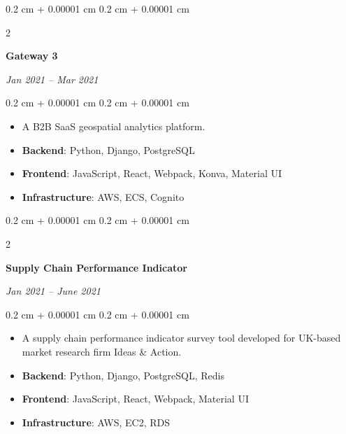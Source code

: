 \documentclass[10pt, a4paper]{article}
\newenvironment{highlights}{
    \begin{itemize}[
        topsep=0.10 cm,
        parsep=0.10 cm,
        partopsep=0pt,
        itemsep=0pt,
        leftmargin=0.4 cm + 10pt
    ]
}{
    \end{itemize}
} %
\newenvironment{onecolentry}{
    \begin{adjustwidth}{
        0.2 cm + 0.00001 cm
    }{
        0.2 cm + 0.00001 cm
    }
}{
    \end{adjustwidth}
} %
\newenvironment{twocolentry}[2][]{
    \onecolentry
    \def\secondColumn{#2}
    \setcolumnwidth{\fill, 4.5 cm}
    \begin{paracol}{2}
}{
    \switchcolumn \raggedleft \secondColumn
    \end{paracol}
    \endonecolentry
} %
\begin{document}
        \vspace{0.2 cm}

        \begin{twocolentry}{
            
            
        \textit{Jan 2021 – Mar 2021}}
            \textbf{Gateway 3}
        \end{twocolentry}

        \vspace{0.10 cm}
        \begin{onecolentry}
            \begin{highlights}
                \item A B2B SaaS geospatial analytics platform.
                \item \textbf{Backend}: Python, Django, PostgreSQL
                \item \textbf{Frontend}: JavaScript, React, Webpack, Konva, Material UI
                \item \textbf{Infrastructure}: AWS, ECS, Cognito
            \end{highlights}
        \end{onecolentry}


        \vspace{0.2 cm}

        \begin{twocolentry}{
            
            
        \textit{Jan 2021 – June 2021}}
            \textbf{Supply Chain Performance Indicator}
        \end{twocolentry}

        \vspace{0.10 cm}
        \begin{onecolentry}
            \begin{highlights}
                \item A supply chain performance indicator survey tool developed for UK-based market research firm Ideas \& Action.
                \item \textbf{Backend}: Python, Django, PostgreSQL, Redis
                \item \textbf{Frontend}: JavaScript, React, Webpack, Material UI
                \item \textbf{Infrastructure}: AWS, EC2, RDS
            \end{highlights}
        \end{onecolentry}


        \vspace{0.2 cm}
\end{document}
